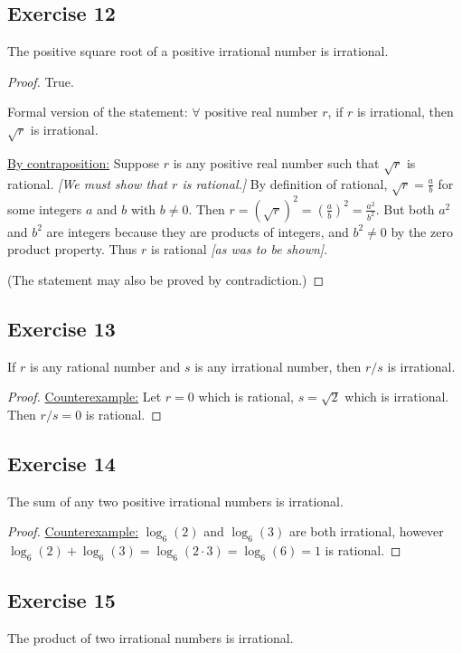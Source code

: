 \documentclass[14pt]{extarticle}
\newcommand{\fa}{\forall}
\begin{document}
\subsection{Exercise 12}
The positive square root of a positive irrational number is irrational.

\begin{proof}
    True.

    Formal version of the statement: $\fa$ positive real number
    $r$, if $r$ is irrational, then $\sqrt{r}$ is irrational.

    \underline{By contraposition:} Suppose $r$ is any positive real number such that $\sqrt{r}$ is rational. {\it [We must show that $r$ is rational.]} By definition of rational, $\sqrt{r} = \frac{a}{b}$ for some integers $a$ and $b$ with $b \neq 0$. Then $r = (\sqrt{r})^2 = \left(\frac{a}{b}\right)^2 = \frac{a^2}{b^2}$. But both $a^2$ and $b^2$ are integers because they are products of integers, and $b^2 \neq 0$ by the zero product property. Thus $r$ is rational {\it [as was to be shown]}.

    (The statement may also be proved by contradiction.)
\end{proof}

\subsection{Exercise 13}
If \(r\) is any rational number and $s$ is any irrational number, then $r/s$ is irrational.

\begin{proof}
    \underline{Counterexample:} Let $r = 0$ which is rational, $s = \sqrt{2}$ which is irrational. Then $r / s = 0$ is rational.
\end{proof}

\subsection{Exercise 14}
The sum of any two positive irrational numbers is irrational.

\begin{proof}
    \underline{Counterexample:} $\log_6(2)$ and $\log_6(3)$ are both irrational, however \\ $\log_6(2) + \log_6(3) = \log_6(2\cdot 3) = \log_6(6) = 1$ is rational.
\end{proof}

\subsection{Exercise 15}
The product of two irrational numbers is irrational.
\end{document}
